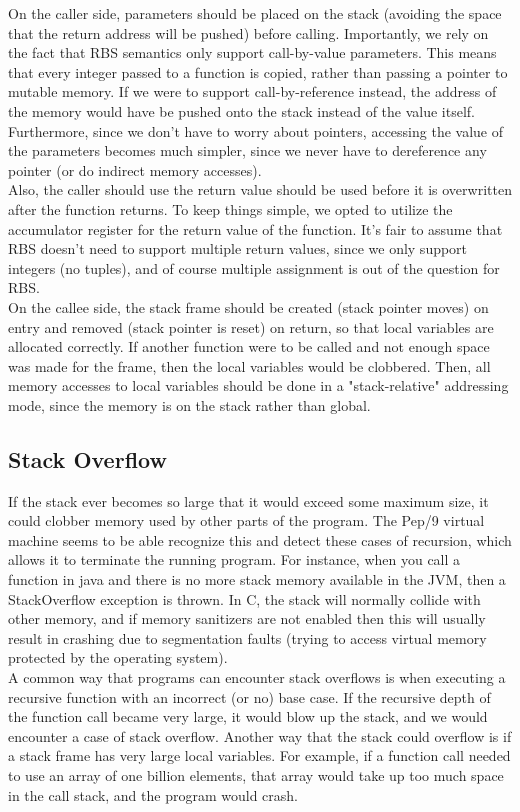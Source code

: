 \documentclass[12pt]{article}
\begin{document}
On the caller side, parameters should be placed on the stack (avoiding the space that the return address will be pushed) before calling. Importantly, we rely on the fact that RBS semantics only support call-by-value parameters. This means that every integer passed to a function is copied, rather than passing a pointer to mutable memory. If we were to support call-by-reference instead, the address of the memory would have be pushed onto the stack instead of the value itself. Furthermore, since we don't have to worry about pointers, accessing the value of the parameters becomes much simpler, since we never have to dereference any pointer (or do indirect memory accesses). \\

Also, the caller should use the return value should be used before it is overwritten after the function returns. To keep things simple, we opted to utilize the accumulator register for the return value of the function. It's fair to assume that RBS doesn't need to support multiple return values, since we only support integers (no tuples), and of course multiple assignment is out of the question for RBS.  \\

On the callee side, the stack frame should be created (stack pointer moves) on entry and removed (stack pointer is reset) on return, so that local variables are allocated correctly. If another function were to be called and not enough space was made for the frame, then the local variables would be clobbered. Then, all memory accesses to local variables should be done in a "stack-relative" addressing mode, since the memory is on the stack rather than global.

\subsection*{Stack Overflow}
If the stack ever becomes so large that it would exceed some maximum size, it could clobber memory used by other parts of the program. The Pep/9 virtual machine seems to be able recognize this and detect these cases of recursion, which allows it to terminate the running program. For instance, when you call a function in java and there is no more stack memory available in the JVM, then a StackOverflow exception is thrown. In C, the stack will normally collide with other memory, and if memory sanitizers are not enabled then this will usually result in crashing due to segmentation faults (trying to access virtual memory protected by the operating system). \\

A common way that programs can encounter stack overflows is when executing a recursive function with an incorrect (or no) base case. If the recursive depth of the function call became very large, it would blow up the stack, and we would encounter a case of stack overflow. Another way that the stack could overflow is if a stack frame has very large local variables. For example, if a function call needed to use an array of one billion elements, that array would take up too much space in the call stack, and the program would crash.
\end{document}
